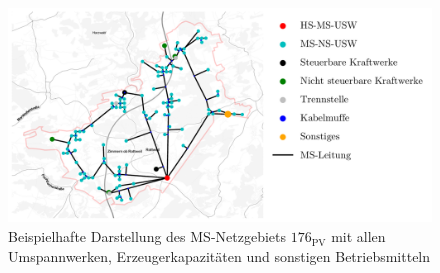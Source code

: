 \begin{figure}[H]
    \centering
    \includegraphics[width=\textwidth]{Bilder/grid_176_map}
    \caption[Beispielhafte Darstellung des MS-Netzgebiets \num{176} mit allen Umspannwerken, Erzeugerkapazitäten und sonstigen Betriebsmitteln]{Beispielhafte Darstellung des MS-Netzgebiets \(176_{\text{PV}}\) mit allen Umspannwerken, Erzeugerkapazitäten und sonstigen Betriebsmitteln}\label{fig:grid_176_map}
\end{figure}